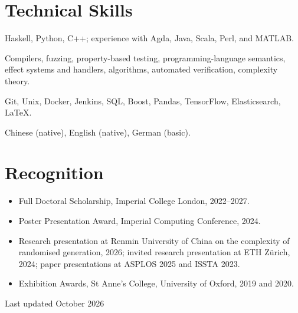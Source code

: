 \documentclass[10pt]{article}
\begin{document}
\section{Technical Skills}

\begin{description}[style=multiline,leftmargin=9.5em]
  \item[Programming] Haskell, Python, C++; experience with Agda, Java, Scala, Perl, and MATLAB.
  \item[Research areas] Compilers, fuzzing, property-based testing, programming-language semantics, effect systems and handlers, algorithms, automated verification, complexity theory.
  \item[Engineering] Git, Unix, Docker, Jenkins, SQL, Boost, Pandas, TensorFlow, Elasticsearch, \LaTeX.
  \item[Languages] Chinese (native), English (native), German (basic).
\end{description}

\section{Recognition}

\begin{itemize}
  \item Full Doctoral Scholarship, Imperial College London, 2022--2027.
  \item Poster Presentation Award, Imperial Computing Conference, 2024.
  \item Research presentation at Renmin University of China on the complexity of randomised generation, 2026; invited research presentation at ETH Z\"urich, 2024; paper presentations at ASPLOS 2025 and ISSTA 2023.
  \item Exhibition Awards, St Anne's College, University of Oxford, 2019 and 2020.
\end{itemize}

\vspace{4pt}
\begin{center}{\small\color{gray}Last updated October 2026}\end{center}
\end{document}
